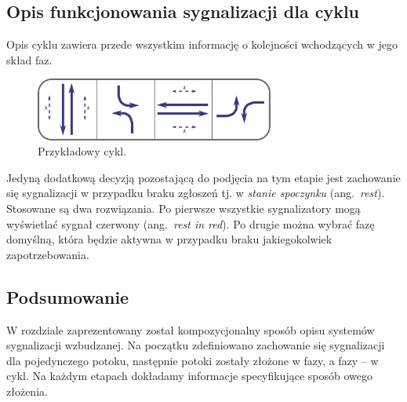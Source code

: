 \documentclass{pracamgr}
\newcommand{\ang}[1]{(ang.~\emph{#1})}
\theoremstyle{plain}
\begin{document}
\subsection{Opis funkcjonowania sygnalizacji dla cyklu} Opis cyklu
zawiera przede wszystkim informację o kolejności wchodzących w jego
skład faz.
\begin{figure} \centering
  \includegraphics[width=0.7\textwidth]{img/signals-cycle-example}
  \caption{Przykładowy cykl.}
\end{figure}
Jedyną dodatkową decyzją pozostającą do podjęcia na tym etapie jest
zachowanie się sygnalizacji w przypadku braku zgłoszeń tj. w
\emph{stanie spoczynku} \ang{rest}. Stosowane są dwa rozwiązania. Po
pierwsze wszystkie sygnalizatory mogą wyświetlać sygnał czerwony
\ang{rest in red}. Po drugie można wybrać fazę domyślną, która będzie
aktywna w przypadku braku jakiegokolwiek zapotrzebowania.

\subsection{Podsumowanie}

W rozdziale zaprezentowany został kompozycjonalny sposób opisu
systemów sygnalizacji wzbudzanej. Na początku zdefiniowano zachowanie
się sygnalizacji dla pojedynczego potoku, następnie potoki zostały
złożone w fazy, a fazy -- w cykl. Na każdym etapach dokładamy
informacje specyfikujące sposób owego złożenia.
\end{document}
